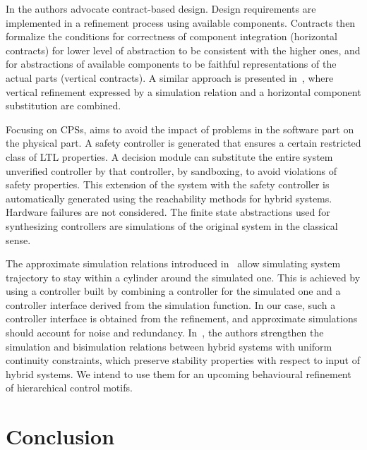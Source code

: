 \documentclass[runningheads]{llncs}
\begin{document}
In \cite{sangiovanni-vincentelli-taming-2012} the authors advocate contract-based design. Design requirements are implemented in a  refinement process using available components. %
Contracts then formalize the conditions for correctness of component integration (horizontal contracts) for lower level of abstraction to be consistent with the higher ones, and for abstractions of available components to be faithful representations of the actual parts (vertical contracts). A similar approach is presented in~\cite{DormoyKL12,LanoixK14}, where vertical refinement expressed by a simulation relation and a horizontal component substitution are combined. 

Focusing on CPSs, \cite{bakSandboxing2011} aims to avoid the impact of problems in the software part on the physical part. A safety controller is generated that ensures a certain restricted class of LTL properties. A decision module can substitute the entire system unverified controller by that controller, by sandboxing, to avoid violations of safety properties. This extension of the system with the safety controller is automatically generated using the reachability methods for hybrid systems. Hardware failures are not considered. The finite state abstractions used for synthesizing controllers are simulations of the original system in the classical sense. 

The approximate simulation relations introduced in~\cite{4177366} allow simulating system trajectory to stay within a cylinder around the simulated one. This is achieved by using a controller built by combining a controller for the simulated one and a controller interface derived from the simulation function. In our case, such a controller interface is obtained from the refinement, and approximate simulations should account for noise and redundancy. 
In~\cite{prabhakar-simulations-2018}, the authors strengthen the simulation and bisimulation relations between hybrid systems with uniform continuity constraints, which preserve stability properties with respect to input of hybrid systems. We intend to use them for an upcoming behavioural refinement of hierarchical control motifs. 

\section{Conclusion}
\label{secn:concl}
\end{document}
